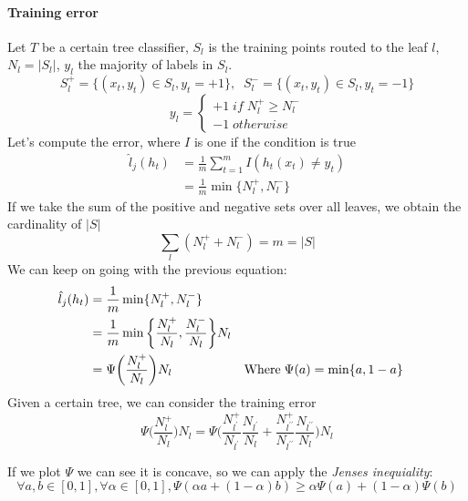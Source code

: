 \paragraph{Training error}
Let $T$ be a certain tree classifier, $S_l$ is the training points routed to the leaf $l$,
$N_l = |S_l|$, $y_l$ the majority of labels in $S_l$.
$$S_l^+ = \{ (x_t, y_t) \in S_l, y_t = +1\},\;\;S_l^- = \{ (x_t, y_t) \in S_l, y_t = -1\}$$
\[
    y_l = \begin{cases}
        +1 \mathit{\;if\;} N_l^+ \geq N_l^-\\
        -1 \mathit{\;otherwise}
    \end{cases}\]
Let's compute the error, where $I$ is one if the condition is true
\begin{equation}
    \begin{aligned}
        \hat{l}_j(h_t) &= \frac{1}{m}\sum_{t=1}^m I(h_t(x_t) \neq y_t)\\
        &= \frac{1}{m}\min\{N_l^+, N_l^-\}
    \end{aligned}
\end{equation}
If we take the sum of the positive and negative sets over all leaves, we 
obtain the cardinality of $|S|$ 
$$\sum_l(N_l^+ + N_l^-) = m = |S|$$
We can keep on going with the previous equation:
\begin{equation}
    \begin{aligned}
        \hat{l}_j(h_t) &= \frac{1}{m}\min\{N_l^+, N_l^-\}\\
        &= \frac{1}{m}\min\bigg\{\frac{N_l^+}{N_l}, \frac{N_l^-}{N_l}\bigg\}N_l\\
        &= \Psi\bigg(\frac{N_l^+}{N_l}\bigg)N_l && \text{Where\;} \Psi(a) = \min\{a, 1-a\}
    \end{aligned}
\end{equation}
Given a certain tree, 
we can consider the training error 
\begin{equation}
    \Psi\bigg(\frac{N_l^+}{N_l}\bigg)N_l = 
    \Psi\bigg(\frac{N_{l^\prime}^+}{N_{l^\prime}}
    \frac{N_{l^\prime}}{N_l}+\frac{N_{l^{\prime\prime}}^+}{N_{l^{\prime\prime}}}
    \frac{N_{l^{\prime\prime}}}{N_l}
    \bigg)N_l
\end{equation}

If we plot $\Psi$ we can see it is concave, so we can apply the \emph{Jenses inequiality}:
$$\forall a,b \in [0,1], \forall \alpha \in [0,1], 
\Psi(\alpha a + (1-\alpha)b) \geq \alpha \Psi(a) + (1-\alpha)\Psi(b)$$

